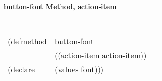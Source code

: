 %
%
%



{\samepage  
{\large {\bf button-font \hfill Method, action-item}}
\begin{flushright} \parbox[t]{6.125in}{
\tt
\begin{tabular}{lll}
\raggedright
(defmethod & button-font & \\
& ((action-item  action-item)) \\
(declare & (values font)))
\end{tabular}
\rm

}\end{flushright}}

